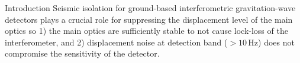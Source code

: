 \documentclass{beamer}
\begin{document}
\begin{frame}[t]
	\begin{columns}[t]
		
		\begin{column}{0.32\linewidth}
			
			\begin{block}{Introduction}
				Seismic isolation for ground-based interferometric gravitation-wave detectors plays a crucial  role for suppressing the displacement level of the main optics so 1) the main optics are sufficiently stable to not cause lock-loss of the interferometer, and 2) displacement noise at detection band ($>10\,\text{Hz}$) does not compromise the sensitivity of the detector.
				\medskip
				

\end{block}
\end{column}
\end{columns}
\end{frame}
\end{document}
